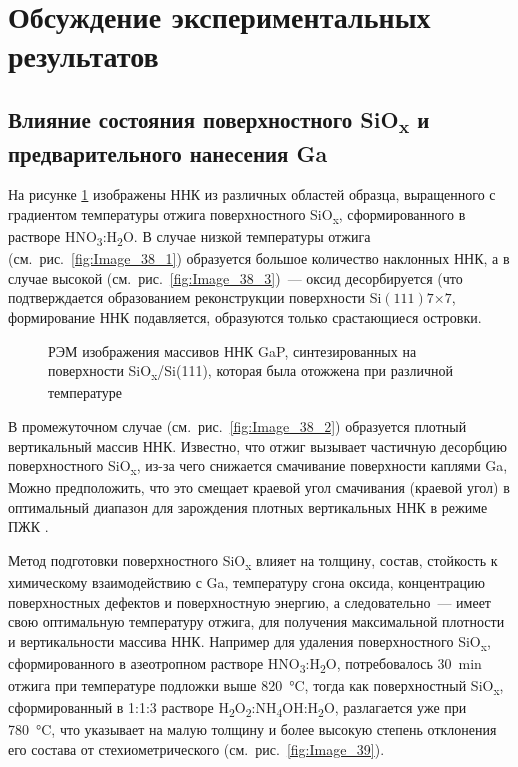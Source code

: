 \section{Обсуждение экспериментальных результатов}\label{sec:ch6/sec2}

\subsection{Влияние состояния поверхностного SiO\textsubscript{x} и
предварительного нанесения Ga}\label{subsec:ch6/sec2/sub1}

На рисунке \cref{fig:Image_38} изображены ННК из различных областей образца,
выращенного с градиентом температуры отжига поверхностного
SiO\textsubscript{x}, сформированного в растворе
HNO\textsubscript{3}:H\textsubscript{2}O. В случае низкой температуры отжига
(см.~рис.~\cref{fig:Image_38_1}) образуется большое количество наклонных ННК, а
в случае высокой (см.~рис.~\cref{fig:Image_38_3})~--- оксид десорбируется (что
подтверждается образованием реконструкции поверхности
Si\((111)7\)\(\times\)\(7\), формирование ННК подавляется, образуются только
срастающиеся островки.

\begin{figure}[ht]  \caption{РЭМ
				изображения массивов ННК GaP, синтезированных на поверхности
				SiO\textsubscript{x}/Si(111), которая была отожжена при различной
		температуре}\label{fig:Image_38} \end{figure}

В промежуточном случае (см.~рис.~\cref{fig:Image_38_2}) образуется плотный
вертикальный массив ННК. Известно, что отжиг вызывает частичную десорбцию
поверхностного SiO\textsubscript{x}, из-за чего снижается смачивание
поверхности каплями Ga, Можно предположить, что это смещает краевой угол
смачивания (краевой угол) в оптимальный диапазон для зарождения плотных
вертикальных ННК в режиме ПЖК \cite{Matteini2015}.

Метод подготовки поверхностного SiO\textsubscript{x} влияет на толщину, состав,
стойкость к химическому взаимодействию с Ga, температуру сгона оксида,
концентрацию поверхностных дефектов и поверхностную энергию, а
следовательно~--- имеет свою оптимальную температуру отжига, для получения
максимальной плотности и вертикальности массива ННК. Например для удаления
поверхностного SiO\textsubscript{x}, сформированного в азеотропном растворе
HNO\textsubscript{3}:H\textsubscript{2}O, потребовалось 30~\si{\minute} отжига
при температуре подложки выше 820~\si{\degreeCelsius}, тогда как поверхностный
SiO\textsubscript{x}, сформированный в 1:1:3 растворе
H\textsubscript{2}O\textsubscript{2}:NH\textsubscript{4}OH:H\textsubscript{2}O,
разлагается уже при 780~\si{\degreeCelsius}, что указывает на малую толщину и
более высокую степень отклонения его состава от стехиометрического
(см.~рис.~\cref{fig:Image_39}).

